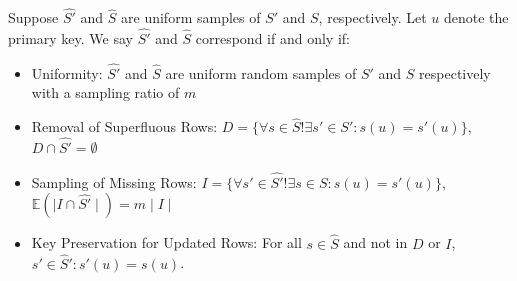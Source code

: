 \begin{property}[Correspondence]
Suppose $\widehat{S'}$ and $\widehat{S}$ are uniform samples of $S'$ and $S$, respectively.  Let $u$ denote the primary key. We say $\widehat{S'}$ and $\widehat{S}$ correspond if and only if:
\vspace{-.25em}
\begin{itemize}[noitemsep]
\item Uniformity: $\widehat{S'}$ and $\widehat{S}$ are uniform random samples of $S'$ and $S$ respectively with a sampling ratio of $m$
\item Removal of Superfluous Rows: $D = \{\forall s \in \widehat{S} !\exists s' \in S': s(u) = s'(u)\}$, $D \cap \widehat{S'} = \emptyset$ 
\item Sampling of Missing Rows: $I = \{\forall s' \in \widehat{S'} !\exists s \in S: s(u) = s'(u)\}$, $\mathbb{E}(\mid I \cap \widehat{S'} \mid) = m\mid I \mid $ 
\item Key Preservation for Updated Rows: For all $s\in \widehat{S}$ and not in $D$ or $I$, $s' \in \widehat{S}': s'(u) = s(u)$.
\end{itemize}
\vspace{-.25em}
\label{correspondence}
\end{property}







